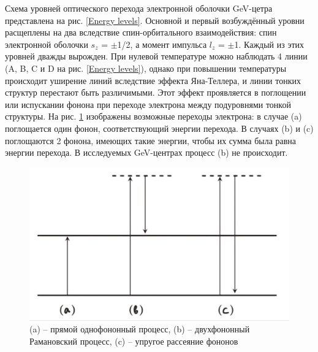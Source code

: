 Схема уровней оптического перехода электронной оболочки GeV-цетра представлена 
на рис. \ref{Energy levels}. Основной и первый возбуждённый уровни расщеплены на два вследствие
спин-орбитального взаимодействия: спин электронной оболочки $s_z$ = $\pm$1/2,
а момент импульса $l_z$ = $\pm$1. Каждый из этих уровней дважды вырожден.
При нулевой температуре можно наблюдать
4 линии (A, B, C и D на рис. \ref{Energy levels}), однако при повышении температуры
происходит уширение линий вследствие эффекта Яна-Теллера, и линии тонких структур
перестают быть различимыми. Этот эффект
проявляется в поглощении или испускании фонона при переходе электрона между
подуровнями тонкой структуры. На рис. \ref{J-T effect} изображены возможные переходы электрона:
в случае (a) поглощается один фонон, соответствующий энергии перехода. В случаях
(b) и (c) поглощаются 2 фонона, имеющих такие энергии, чтобы их сумма была 
равна энергии перехода. В исследуемых GeV-центрах процесс (b) не происходит.




\begin{figure}[!h]
    \begin{center}
        \includegraphics[width=0.5 \linewidth]{Jahn-Teller effect.jpg}
        \caption{(a) -- прямой однофононный процесс, (b) -- двухфононный
        Рамановский процесс, (c) -- упругое рассеяние фононов}
        \label{J-T effect}
    \end{center}
\end{figure}



